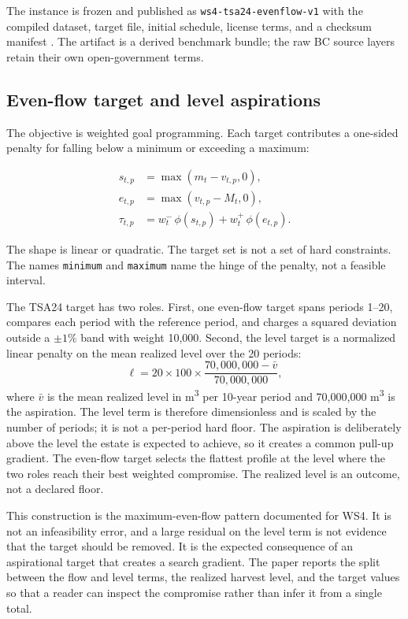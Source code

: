 \documentclass[11pt]{article}
\begin{document}
The instance is frozen and published as \texttt{ws4-tsa24-evenflow-v1} with the compiled dataset, target file, initial schedule, license terms, and a checksum manifest \citep{tsa24artifact}. The artifact is a derived benchmark bundle; the raw BC source layers retain their own open-government terms.

\subsection{Even-flow target and level aspirations}\label{even-flow-target-and-level-aspirations}

The objective is weighted goal programming. Each target contributes a one-sided penalty for falling below a minimum or exceeding a maximum:

\begin{align}
s_{t,p} &= \max(m_t - v_{t,p}, 0),\\
e_{t,p} &= \max(v_{t,p} - M_t, 0),\\
\tau_{t,p} &= w^-_t\,\phi(s_{t,p}) + w^+_t\,\phi(e_{t,p}).
\end{align}

The shape is linear or quadratic. The target set is not a set of hard constraints. The names \texttt{minimum} and \texttt{maximum} name the hinge of the penalty, not a feasible interval.

The TSA24 target has two roles. First, one even-flow target spans periods 1--20, compares each period with the reference period, and charges a squared deviation outside a $\pm1\%$ band with weight 10,000. Second, the level target is a normalized linear penalty on the mean realized level over the 20 periods:
\[
\ell = 20 \times 100 \times \frac{70{,}000{,}000 - \bar v}{70{,}000{,}000},
\]
where $\bar v$ is the mean realized level in m\textsuperscript{3} per 10-year period and 70,000,000 m\textsuperscript{3} is the aspiration. The level term is therefore dimensionless and is scaled by the number of periods; it is not a per-period hard floor. The aspiration is deliberately above the level the estate is expected to achieve, so it creates a common pull-up gradient. The even-flow target selects the flattest profile at the level where the two roles reach their best weighted compromise. The realized level is an outcome, not a declared floor.

This construction is the maximum-even-flow pattern documented for WS4. It is not an infeasibility error, and a large residual on the level term is not evidence that the target should be removed. It is the expected consequence of an aspirational target that creates a search gradient. The paper reports the split between the flow and level terms, the realized harvest level, and the target values so that a reader can inspect the compromise rather than infer it from a single total.
\end{document}
